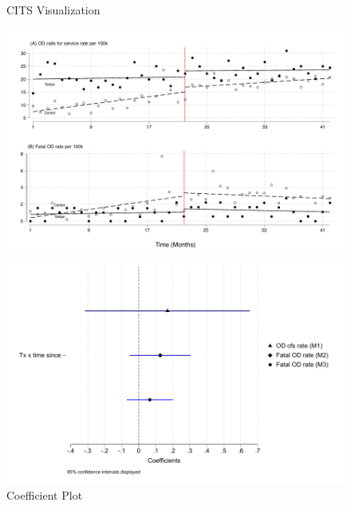 

 

  
\newpage


\begin{figure}
\begin{minipage}{1 \textwidth}
    \centering
    \caption{\centering CITS Visualization}
    \includegraphics{figures/itsa-combined.pdf}
\end{minipage}
\begin{minipage}{1 \textwidth}
    \centering
    \caption{\centering Coefficient Plot}
    \includegraphics{figures/coefplot.pdf}
\end{minipage}
\end{figure}



